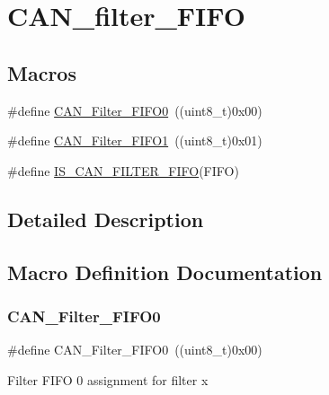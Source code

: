 \hypertarget{group___c_a_n__filter___f_i_f_o}{}\section{C\+A\+N\+\_\+filter\+\_\+\+F\+I\+FO}
\label{group___c_a_n__filter___f_i_f_o}
\subsection*{Macros}
\begin{DoxyCompactItemize}
\item 
\#define \mbox{\hyperlink{group___c_a_n__filter___f_i_f_o_ga8249c27978ca94676530540b88a6be8f}{C\+A\+N\+\_\+\+Filter\+\_\+\+F\+I\+F\+O0}}~((uint8\+\_\+t)0x00)
\item 
\#define \mbox{\hyperlink{group___c_a_n__filter___f_i_f_o_gaab8478c89a607c4b8baf68efc730e316}{C\+A\+N\+\_\+\+Filter\+\_\+\+F\+I\+F\+O1}}~((uint8\+\_\+t)0x01)
\item 
\#define \mbox{\hyperlink{group___c_a_n__filter___f_i_f_o_ga2df5ae0de841fc80c969e9147991ec9d}{I\+S\+\_\+\+C\+A\+N\+\_\+\+F\+I\+L\+T\+E\+R\+\_\+\+F\+I\+FO}}(F\+I\+FO)
\end{DoxyCompactItemize}


\subsection{Detailed Description}


\subsection{Macro Definition Documentation}
\mbox{\label{group___c_a_n__filter___f_i_f_o_ga8249c27978ca94676530540b88a6be8f}} 
\subsubsection{\texorpdfstring{CAN\_Filter\_FIFO0}{CAN\_Filter\_FIFO0}}
{\footnotesize\ttfamily \#define C\+A\+N\+\_\+\+Filter\+\_\+\+F\+I\+F\+O0~((uint8\+\_\+t)0x00)}

Filter F\+I\+FO 0 assignment for filter x \mbox{\label{group___c_a_n__filter___f_i_f_o_gaab8478c89a607c4b8baf68efc730e316}} 
